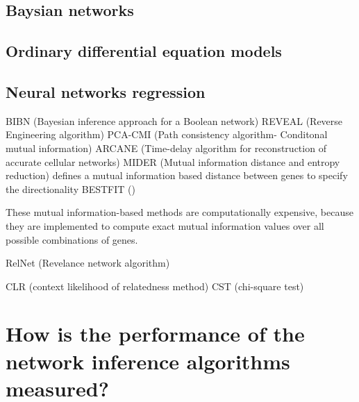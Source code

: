 \citep{REMY2008335}



\citep{CHAI201455}
\subsection{Baysian networks}



\subsection{Ordinary differential equation models}



\subsection{Neural networks regression}
BIBN (Bayesian inference approach for a Boolean network)
REVEAL (Reverse Engineering algorithm)
PCA-CMI (Path consistency algorithm- Conditonal mutual information)
ARCANE (Time-delay algorithm for reconstruction of accurate cellular networks)
MIDER (Mutual information distance and entropy reduction)\citep{MIDER}
	defines a mutual information based distance between genes to specify the directionality
BESTFIT ()

These mutual information-based methods are computationally expensive, because they are implemented to compute exact mutual information values over all possible combinations of genes.

RelNet (Revelance network algorithm)

CLR (context likelihood of relatedness method)
CST (chi-square test)





\section{How is the performance of the network inference algorithms measured?}









